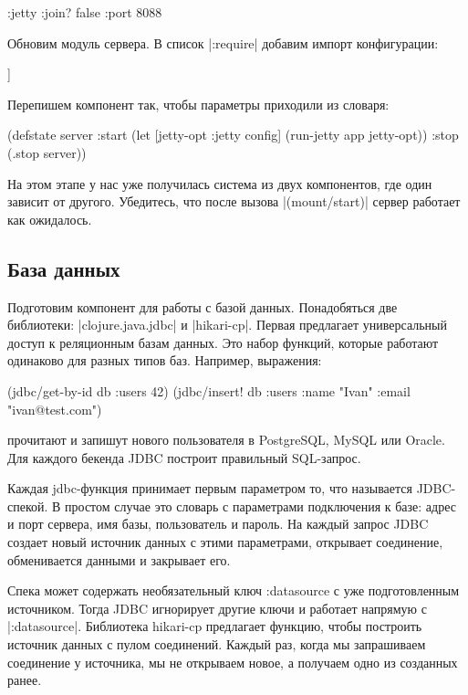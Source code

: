 \begin{code}
{:jetty {:join? false :port 8088}}
\end{code}

Обновим модуль сервера. В список \spverb|:require| добавим импорт конфигурации:

\begin{code}
[book.systems.mount.config :refer [config]]
\end{code}

Перепишем компонент так, чтобы параметры приходили из словаря:

\begin{code}
(defstate
  server
  :start
  (let [{jetty-opt :jetty} config]
    (run-jetty app jetty-opt))
  :stop (.stop server))
\end{code}

На этом этапе у нас уже получилась система из двух компонентов, где один зависит
от другого. Убедитесь, что после вызова \spverb|(mount/start)| сервер работает как
ожидалось.

\subsection{База данных}

Подготовим компонент для работы с базой данных. Понадобяться две библиотеки:
\spverb|clojure.java.jdbc| и \spverb|hikari-cp|. Первая предлагает универсальный доступ к
реляционным базам данных. Это набор функций, которые работают одинаково для
разных типов баз. Например, выражения:

\begin{code}
(jdbc/get-by-id db :users 42)
(jdbc/insert! db :users {:name "Ivan" :email "ivan@test.com"})
\end{code}

прочитают и запишут нового пользователя в PostgreSQL, MySQL или Oracle. Для
каждого бекенда JDBC построит правильный SQL-запрос.

Каждая jdbc-функция принимает первым параметром то, что называется
JDBC-спекой. В простом случае это словарь с параметрами подключения к базе:
адрес и порт сервера, имя базы, пользователь и пароль. На каждый запрос JDBC
создает новый источник данных с этими параметрами, открывает соединение,
обменивается данными и закрывает его.

Спека может содержать необязательный ключ :datasource с уже подготовленным
источником. Тогда JDBC игнорирует другие ключи и работает напрямую с
\spverb|:datasource|. Библиотека hikari-cp предлагает функцию, чтобы построить источник
данных с пулом соединений. Каждый раз, когда мы запрашиваем соединение у
источника, мы не открываем новое, а получаем одно из созданных ранее.

